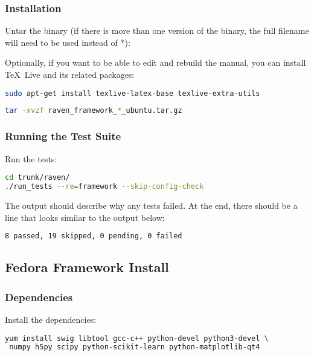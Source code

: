 \subsubsection{Installation}
Untar the binary (if there is more than one version of the
binary, the full filename will need to be used instead of *):


Optionally, if you want to be able to edit and rebuild the manual, you can 
install \TeX~Live and its related packages:
\begin{lstlisting}[language=bash]
sudo apt-get install texlive-latex-base texlive-extra-utils
\end{lstlisting}


\begin{lstlisting}[language=bash]
tar -xvzf raven_framework_*_ubuntu.tar.gz
\end{lstlisting}

\subsubsection{Running the Test Suite}
Run the tests:

\begin{lstlisting}[language=bash]
cd trunk/raven/
./run_tests --re=framework --skip-config-check
\end{lstlisting}

The output should describe why any tests failed.
%
At the end, there should be a line that looks similar to the output below:
\begin{lstlisting}[language=bash]
8 passed, 19 skipped, 0 pending, 0 failed
\end{lstlisting}

\subsection{Fedora Framework Install}

\subsubsection{Dependencies}
Install the dependencies:

\begin{lstlisting}[language=bash]
yum install swig libtool gcc-c++ python-devel python3-devel \
 numpy h5py scipy python-scikit-learn python-matplotlib-qt4
\end{lstlisting}


